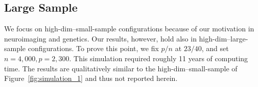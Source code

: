 \documentclass[]{bio}
\begin{document}
\subsection{Large Sample}
\label{sec:large-sample}

We focus on high-dim--small-sample configurations because of our motivation in neuroimaging and genetics. 
Our results, however, hold also in high-dim--large-sample configurations.
To prove this point, we fix $p/n$ at $23/40$, and set $n=4,000, p=2,300$. 
This simulation required roughly 11 years of computing time.
The results are qualitatively similar to the high-dim--small-sample of Figure~\ref{fig:simulation_1} and thus not reported herein.






%
%
%
%
%
\end{document}
